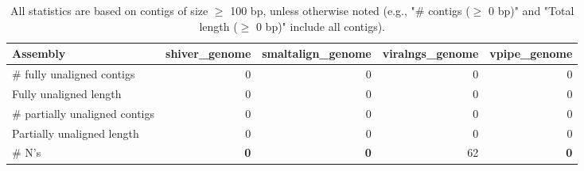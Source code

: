 \documentclass[12pt,a4paper]{article}
\begin{document}
\begin{table}[ht]
\begin{center}
\caption{All statistics are based on contigs of size $\geq$ 100 bp, unless otherwise noted (e.g., "\# contigs ($\geq$ 0 bp)" and "Total length ($\geq$ 0 bp)" include all contigs).}
\begin{tabular}{|l*{4}{|r}|}
\hline
Assembly & shiver\_genome & smaltalign\_genome & viralngs\_genome & vpipe\_genome \\ \hline
\# fully unaligned contigs & 0 & 0 & 0 & 0 \\ \hline
Fully unaligned length & 0 & 0 & 0 & 0 \\ \hline
\# partially unaligned contigs & 0 & 0 & 0 & 0 \\ \hline
Partially unaligned length & 0 & 0 & 0 & 0 \\ \hline
\# N's & {\bf 0} & {\bf 0} & 62 & {\bf 0} \\ \hline
\end{tabular}
\end{center}
\end{table}
\end{document}
